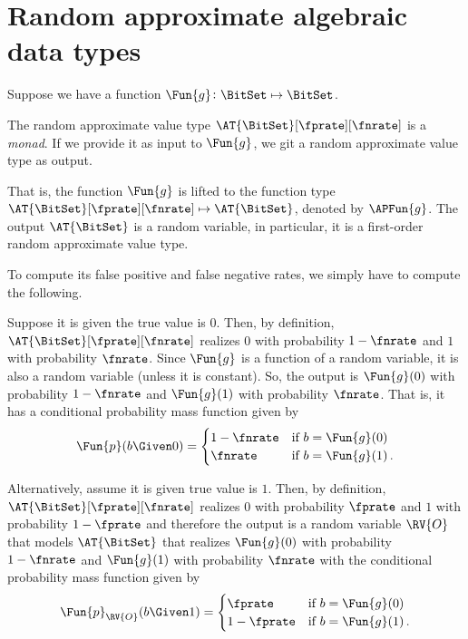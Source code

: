 \documentclass[ ../main.tex]{subfiles}
\begin{document}
\section{Random approximate algebraic data types}


Suppose we have a function $\Fun{g} \colon \BitSet \mapsto \BitSet$.

The random approximate value type $\AT{\BitSet}[\fprate][\fnrate]$ is a \emph{monad}.
If we provide it as input to $\Fun{g}$, we git a random approximate value type as output.

That is, the function $\Fun{g}$ is lifted to the function type $\AT{\BitSet}[\fprate][\fnrate] \mapsto \AT{\BitSet}$, denoted by $\APFun{g}$.
The output $\AT{\BitSet}$ is a random variable, in particular, it is a first-order random approximate value type.

To compute its false positive and false negative rates, we simply have to compute the following.

Suppose it is given the true value is $0$.
Then, by definition, $\AT{\BitSet}[\fprate][\fnrate]$ realizes $0$ with probability $1-\fnrate$ and $1$ with probability $\fnrate$.
Since $\Fun{g}$ is a function of a random variable, it is also a random variable (unless it is constant).
So, the output is $\Fun{g}(0)$ with probability $1-\fnrate$ and $\Fun{g}(1)$ with probability $\fnrate$.
That is, it has a conditional probability mass function given by
\begin{equation}
\Fun{p}(b \Given 0) =
\begin{cases}
1-\fnrate 	& \text{if $b = \Fun{g}(0)$} \\
\fnrate	 	& \text{if $b = \Fun{g}(1)$}\,.
\end{cases}
\end{equation}

Alternatively, assume it is given true value is $1$.
Then, by definition, $\AT{\BitSet}[\fprate][\fnrate]$ realizes $0$ with probability $\fprate$ and $1$ with probability $1-\fprate$ and therefore the output is a random variable $\RV{O}$ that models $\AT{\BitSet}$ that realizes $\Fun{g}(0)$ with probability $1-\fnrate$ and $\Fun{g}(1)$ with probability $\fnrate$ with the conditional probability mass function given by
\begin{equation}
\Fun{p}_{\RV{O}}(b \Given 1) =
\begin{cases}
\fprate 	& \text{if $b = \Fun{g}(0)$} \\
1-\fprate	& \text{if $b = \Fun{g}(1)$}\,.
\end{cases}
\end{equation}
\end{document}
